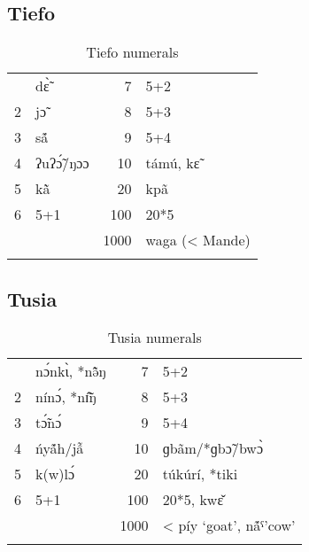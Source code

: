  
\subsection{Tiefo}%
\begin{table}
\caption{\label{tab:3:184}Tiefo numerals}
\begin{tabularx}{\textwidth}{lQrX}
 & d{\`{\~ɛ}} & 7 & 5+2\\
2 & j{\~{ɔ}} & 8 & 5+3\\
3 & s{\'ã} & 9 & 5+4\\
4 & ʔuʔ{\'{\~ɔ}}/ŋɔɔ & 10 & támú, k{\~{ɛ}}~\\
5 & k{\`ã} & 20 & kp{\~{a}}\\
6 & 5+1 & 100 & 20*5\\
&  & 1000 & waga (< Mande)\\
\lspbottomrule
\end{tabularx}
\end{table}

\largerpage[2]

\subsection{Tusia}%
\begin{table}
\caption{\label{tab:3:185}Tusia numerals}
\begin{tabularx}{\textwidth}{lQrX}
 & n{\'{ɔ}}nk{\`{ɩ}}, *n{\~{\^ə}}ŋ & 7 & 5+2\\
2 & nín{\'{ɔ}}, *n{\~{\^ɪ}}ŋ & 8 & 5+3\\
3 & t{\'{\~ɔ}}n{\'{ɔ}} & 9 & 5+4\\
4 & {\'{n}}y{\'ã}h/j{\~{\^a}} & 10 & ɡb{\~{a}}m/*ɡb{\~{ɔ}}/bw{\`{ɔ}}\\
5 & k(w)l{\'{ɔ}} & 20 & túkúrí, *tiki\\
6 & 5+1 & 100 & 20*5, kw{\v{ɛ}}\\
&  & 1000 & < píy `goat’, n{\'ã}ˤ'cow'\\
\lspbottomrule
\end{tabularx}
\end{table}

 \clearpage
